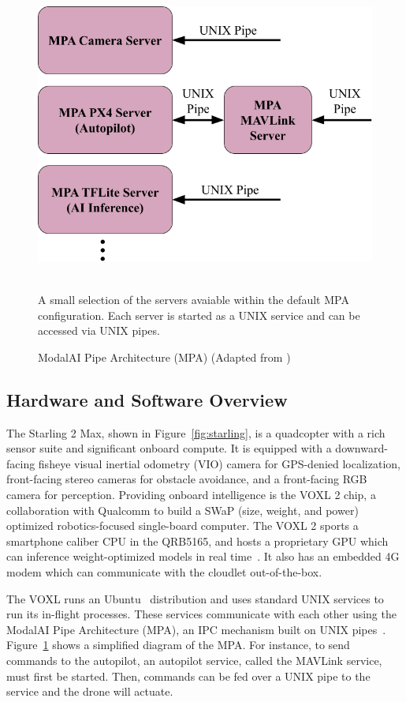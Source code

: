 \begin{figure}
    \centering
    \includegraphics[width=0.5\linewidth]{chapter7/FIGS/mpa.png}
    \begin{captext}
        \\[0.1cm] \small A small selection of the servers avaiable within the default MPA configuration. Each server is started as a UNIX service and can be accessed via UNIX pipes.
    \end{captext}
    \caption{ModalAI Pipe Architecture (MPA) (Adapted from \cite{VOXLSDK})}
    \label{fig:mpa}
\end{figure}

\subsection{Hardware and Software Overview}
The Starling 2 Max, shown in Figure~\ref{fig:starling}, is a quadcopter with a rich sensor suite and significant onboard compute. It is equipped with a downward-facing fisheye visual inertial odometry (VIO) camera for GPS-denied localization, front-facing stereo cameras for obstacle avoidance, and a front-facing RGB camera for perception. Providing onboard intelligence is the VOXL 2 chip, a collaboration with Qualcomm to build a SWaP (size, weight, and power) optimized robotics-focused single-board computer. The VOXL 2 sports a smartphone caliber CPU in the QRB5165, and hosts a proprietary GPU which can inference weight-optimized  models in real time~\cite{VOXL2}. It also has an embedded 4G modem which can communicate with the cloudlet out-of-the-box.

The VOXL runs an Ubuntu~\cite{Ubuntu} distribution and uses standard UNIX services to run its in-flight processes. These services communicate with each other using the ModalAI Pipe Architecture (MPA), an IPC mechanism built on UNIX pipes~\cite{VOXLSDK}. Figure~\ref{fig:mpa} shows a simplified diagram of the MPA. For instance, to send commands to the autopilot, an autopilot service, called the MAVLink service, must first be started. Then, commands can be fed over a UNIX pipe to the service and the drone will actuate.

